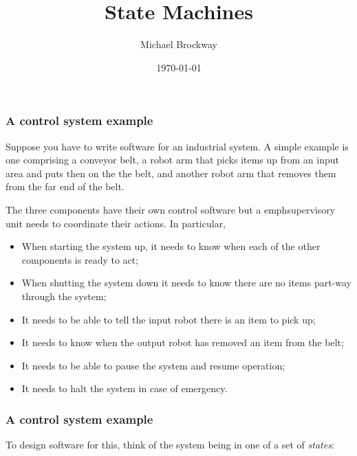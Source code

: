 \documentclass[10pt, hyperref={pdfpagelabels=false}]{beamer}
\title{State Machines}
\author{Michael Brockway}
\date{\today}
\begin{document}
\begin{frame}
\titlepage
\end{frame}

\begin{frame}
\frametitle{A control system example}
Suppose you have to write software for an industrial system. A simple example is one comprising a conveyor belt, a robot arm that picks items up from an input area and puts then on the the belt, and another robot arm that removes them from the far end of the belt.

The three components have their own control software but a emph{supervisory unit} needs to coordinate their actions. In particular,
\begin{itemize}
\item When starting the system up, it needs to know when each of the other components is ready to act;
\item When shutting the system down it needs to know there are no items part-way through the system;
\item It needs to be able to tell the input robot there is an item to pick up;
\item It needs to know when the output robot has removed an item from the belt;
\item It needs to be able to pause the system and resume operation;
\item It needs to halt the system in case of emergency.
\end{itemize}
\end{frame}

\begin{frame}
\frametitle{A control system example}
To design software for this, think of the system being in one of a set of \emph{states}:
\begin{center}
\end{center}
\end{frame}
\end{document}
